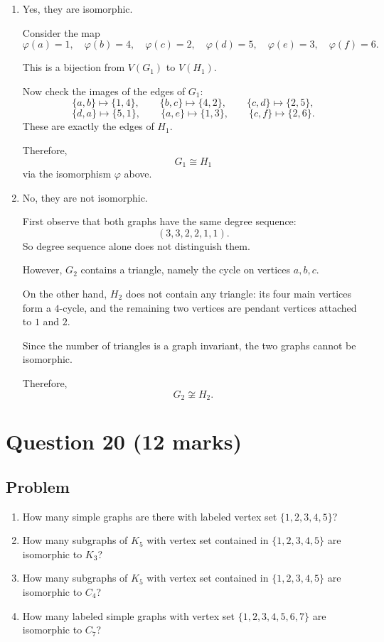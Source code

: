 \documentclass[12pt]{article}
\begin{document}
\begin{enumerate}[label=(\alph*)]
    \item Yes, they are isomorphic.

    Consider the map
    \[
    \varphi(a)=1,
    \quad
    \varphi(b)=4,
    \quad
    \varphi(c)=2,
    \quad
    \varphi(d)=5,
    \quad
    \varphi(e)=3,
    \quad
    \varphi(f)=6.
    \]

    This is a bijection from $V(G_1)$ to $V(H_1)$.

    Now check the images of the edges of $G_1$:
    \[
    \{a,b\}\mapsto \{1,4\},
    \qquad
    \{b,c\}\mapsto \{4,2\},
    \qquad
    \{c,d\}\mapsto \{2,5\},
    \]
    \[
    \{d,a\}\mapsto \{5,1\},
    \qquad
    \{a,e\}\mapsto \{1,3\},
    \qquad
    \{c,f\}\mapsto \{2,6\}.
    \]
    These are exactly the edges of $H_1$.

    Therefore,
    \[
    \boxed{G_1\cong H_1}
    \]
    via the isomorphism $\varphi$ above.

    \item No, they are not isomorphic.

    First observe that both graphs have the same degree sequence:
    \[
    (3,3,2,2,1,1).
    \]
    So degree sequence alone does not distinguish them.

    However, $G_2$ contains a triangle, namely the cycle on vertices $a,b,c$.

    On the other hand, $H_2$ does not contain any triangle: its four main vertices form a $4$-cycle, and the remaining two vertices are pendant vertices attached to $1$ and $2$.

    Since the number of triangles is a graph invariant, the two graphs cannot be isomorphic.

    Therefore,
    \[
    \boxed{G_2\not\cong H_2.}
    \]
\end{enumerate}

\newpage
\section{Question 20 \hfill (12 marks)}
\subsection{Problem}

\begin{enumerate}[label=(\alph*)]
    \item How many simple graphs are there with labeled vertex set $\{1,2,3,4,5\}$?
    \item How many subgraphs of $K_5$ with vertex set contained in $\{1,2,3,4,5\}$ are isomorphic to $K_3$?
    \item How many subgraphs of $K_5$ with vertex set contained in $\{1,2,3,4,5\}$ are isomorphic to $C_4$?
    \item How many labeled simple graphs with vertex set $\{1,2,3,4,5,6,7\}$ are isomorphic to $C_7$?
\end{enumerate}
\end{document}
